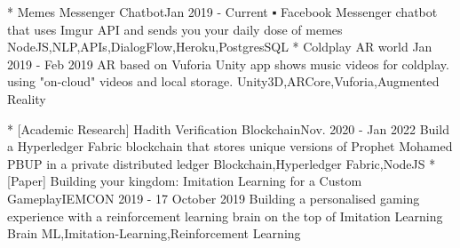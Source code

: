 %
%

\twocolumnsection
{ 
\begin{projects}
		\project
	{* Memes Messenger Chatbot}{Jan 2019 - Current}
	{ }
	{▪	Facebook Messenger chatbot that uses Imgur API and sends you your daily dose of memes }
	{NodeJS,NLP,APIs,DialogFlow,Heroku,PostgresSQL}
		\project
	{* Coldplay AR world }{Jan 2019 - Feb 2019}
	{ 
	}
	{AR based on Vuforia Unity app shows music videos for coldplay. using "on-cloud" videos and local storage.}
	{Unity3D,ARCore,Vuforia,Augmented Reality}
\end{projects}}
{
\begin{projects}
		\project
	{* [Academic Research] Hadith Verification Blockchain}{Nov. 2020 - Jan 2022}
	{}
	{Build a Hyperledger Fabric blockchain that stores unique versions of Prophet Mohamed PBUP in a private distributed ledger }
	{Blockchain,Hyperledger Fabric,NodeJS}	
			\project
	{* [Paper] Building your kingdom: Imitation Learning for a Custom Gameplay}{IEMCON 2019 - 17 October 2019}
	{\paperSymbol{ }
	}
	{Building a personalised gaming experience with a reinforcement learning brain on the top of Imitation Learning Brain}
	{ML,Imitation-Learning,Reinforcement Learning} 
\end{projects}}



